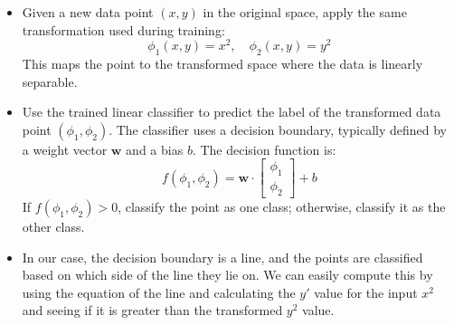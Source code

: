 \documentclass{article}
\begin{document}
\begin{itemize}
    \item Given a new data point \((x, y)\) in the original space, apply the same transformation used during training:
    \[
    \phi_1(x, y) = x^2, \quad \phi_2(x, y) = y^2
    \]
    This maps the point to the transformed space where the data is linearly separable.

    \item Use the trained linear classifier to predict the label of the transformed data point \((\phi_1, \phi_2)\).
    The classifier uses a decision boundary, typically defined by a weight vector \( \mathbf{w} \) and a bias \( b \). The decision function is:
    \[
    f(\phi_1, \phi_2) = \mathbf{w} \cdot \begin{bmatrix} \phi_1 \\ \phi_2 \end{bmatrix} + b
    \]
    If \( f(\phi_1, \phi_2) > 0 \), classify the point as one class; otherwise, classify it as the other class.

    \item In our case, the decision boundary is a line, and the points are classified based on which side of the line they lie on. We can easily compute this by using the equation of the line and calculating the \(y'\) value for the input \(x^2\) and seeing if it is greater than the transformed \(y^2\) value.
\end{itemize}
\end{document}
